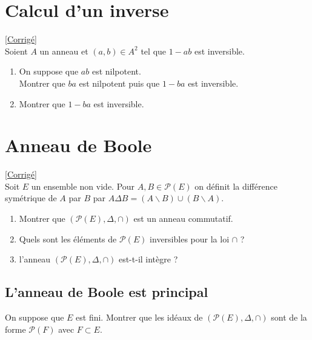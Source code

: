 \documentclass[8pt]{book}
\begin{document}
	\section{Calcul d'un inverse }
	\label{Calcul d'un inverse}
	\textcolor{blue}{\hyperref[Calcul d'un inverse corrigé]{[Corrigé]}}\\
	Soient $A$ un anneau et $(a,b)\in A^2$ tel que $1-ab$ est inversible.
	\begin{enumerate}
		\item On suppose que $ab$ est nilpotent.\\
		Montrer que $ba$ est nilpotent puis que $1-ba$ est inversible.
		\item Montrer que $1-ba$ est inversible.
	\end{enumerate}
	
	\section{Anneau de Boole }
	\label{Anneau de Boole}
	\textcolor{blue}{\hyperref[Anneau de Boole corrigé]{[Corrigé]}}\\
	Soit $E$ un ensemble non vide. Pour $A,B\in \mathcal P(E)$ on définit la différence symétrique de $A$ par $B$ par $A\Delta B=(A\backslash B)\cup (B\backslash A)$.
	\begin{enumerate}
		\item Montrer que $(\mathcal P(E),\Delta,\cap)$ est un anneau commutatif.
		\item Quels sont les éléments de $\mathcal P(E)$ inversibles pour la loi $\cap$ ?
		\item l'anneau $(\mathcal P(E),\Delta,\cap)$ est-t-il intègre ?
	\end{enumerate}
	
	\subsection{L'anneau de Boole est principal }
	On suppose que $E$ est fini. Montrer que les idéaux de $(\mathcal P(E),\Delta,\cap)$ sont de la forme $\mathcal P(F)$ avec $F\subset E$.
	
\end{document}
